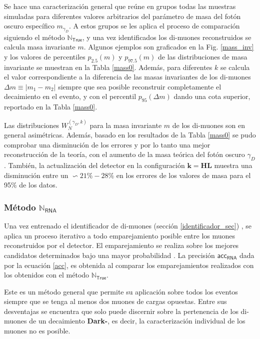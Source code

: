 Se hace una caracterización general que reúne en grupos todas las muestras simuladas para diferentes valores arbitrarios del parámetro de masa del fotón oscuro específico $m_{\gamma_D}$. A estos grupos se les aplica el proceso de comparación siguiendo el método $\mathbb{N}_\textsf{True}$, y una vez identificados los di-muones reconstruidos se calcula masa invariante $m$. Algunos ejemplos son graficados en la Fig. \ref{mass_inv} y los valores de percentiles $p_{2.5}(m)$ y $p_{97.5}(m)$ de las distribuciones de masa invariante se muestran en la Tabla \ref{mass0}. Además, para diferentes $k$ se calcula el valor correspondiente a la diferencia de las masas invariantes de los di-muones $\Delta m\equiv|m_1-m_2|$ siempre que sea posible reconstruir completamente el decaimiento en el evento, y con el percentil $p_{95}(\Delta m )$ dando una cota superior, reportado en la Tabla \ref{mass0}.

Las distribuciones $W_N^{(\gamma_D,k)}$ para la masa invariante $m$ de los di-muones son en general asimétricas. Además, basado en los resultados de la Tabla \ref{mass0} se pudo comprobar una disminución de los errores y por lo tanto una mejor reconstrucción de la teoría, con el aumento de la masa teórica del fotón oscuro $\gamma_D$. También, la actualización del detector en la configuración $\mathbf{k = HL}$ muestra una disminución entre un $\backsim 21\%-28\%$ en los errores de los valores de masa para el 95\% de los datos. 



\subsubsection{Método $\mathbb{N}_\textsf{RNA}$}
Una vez entrenado el identificador de di-muones (sección \ref{identificador_sec}) %
, se aplica un proceso iterativo a todo emparejamiento posible entre los muones reconstruidos por el detector. El emparejamiento se realiza sobre los mejores candidatos determinados bajo una mayor probabilidad%
. La precisión $\textsf{acc}_\textsf{RNA}$ dada por la ecuación \ref{acc}, es obtenida al comparar los emparejamientos realizados con los obtenidos con el método $\mathbb{N}_\textsf{True}$.

Este es un método general que permite su aplicación sobre todos los eventos siempre que se tenga al menos dos muones de cargas opuestas. %
Entre sus desventajas se encuentra que solo puede discernir sobre la pertenencia de los di-muones de un decaimiento \textbf{Dark-}\SUSY, es decir, la caracterización individual de los muones no es posible.

